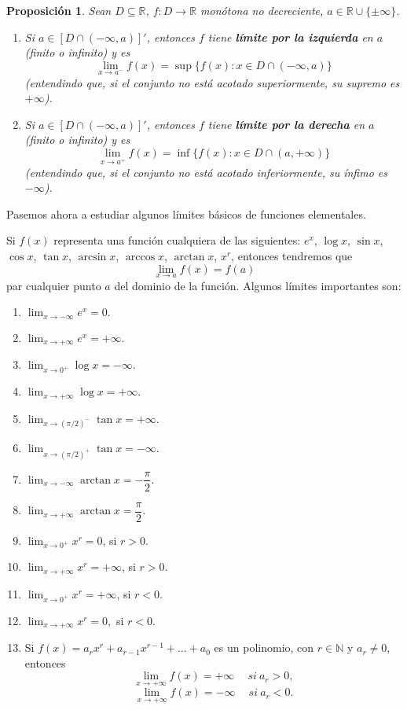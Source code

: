 \documentclass[12pt]{article}
\newtheorem{proposition}[theorem]{Proposición}
\begin{document}
\begin{proposition}Sean $D \subseteq \mathbb{R}$, $f \colon D \longrightarrow \mathbb{R}$ monótona no decreciente, $a \in \mathbb{R} \cup \lbrace \pm \infty \rbrace$. 
\begin{enumerate}
\item Si $a \in [D \cap (- \infty, a)]'$, entonces $f$ tiene \textbf{límite por la izquierda} en $a$ (finito o infinito) y es $$\lim_{x \rightarrow a^-} f(x) = \sup \lbrace f(x) : x \in D \cap (-\infty,a) \rbrace$$ (entendindo que, si el conjunto no está acotado superiormente, su supremo es $+ \infty$).
\item Si $a \in [D \cap (- \infty, a)]'$, entonces $f$ tiene \textbf{límite por la derecha} en $a$ (finito o infinito) y es $$\lim_{x \rightarrow a^+} f(x) = \inf \lbrace f(x) : x \in D \cap (a,+\infty) \rbrace$$ (entendindo que, si el conjunto no está acotado inferiormente, su ínfimo es $- \infty$).
\end{enumerate}
\end{proposition}

Pasemos ahora a estudiar algunos límites básicos de funciones elementales.

Si $f(x)$ representa una función cualquiera de las siguientes: $e^x$, $\log x$, $\sin x$, $\cos x$, $\tan x$, $\arcsin x$, $\arccos x$, $\arctan x$, $x^r$, entonces tendremos que $$\lim_{x\rightarrow a} f(x) = f(a)$$ par cualquier punto $a$ del dominio de la función. Algunos límites importantes son: \begin{enumerate}
\item $\lim_{x \rightarrow - \infty} e^x = 0.$
\item $\lim_{x \rightarrow +\infty} e^x = + \infty.$
\item $\lim_{x \rightarrow 0^+} \log x = - \infty.$
\item $\lim_{x \rightarrow +\infty} \log x = +\infty.$
\item $\lim_{x \rightarrow (\pi /2 )^-} \tan x = +\infty.$
\item $\lim_{x \rightarrow (\pi /2 )^+} \tan x = -\infty.$
\item $\lim_{x \rightarrow -\infty} \arctan x = -\dfrac{\pi}{2}.$
\item $\lim_{x \rightarrow +\infty} \arctan x = \dfrac{\pi}{2}.$
\item $\lim_{x \rightarrow 0^+} x^r = 0$, si $r>0.$
\item $\lim_{x \rightarrow +\infty} x^r = +\infty$, si $r>0$.
\item $\lim_{x \rightarrow 0^+} x^r = +\infty$, si $r<0$.
\item $\lim_{x \rightarrow +\infty} x^r = 0,$ si $r<0$.
\item Si $f(x) = a_rx^r+a_{r-1}x^{r-1} + \ldots + a_0$ es un polinomio, con $r \in \mathbb{N}$ y $a_r \neq 0$, entonces $$\lim_{x \rightarrow +\infty} f(x) = +\infty \quad~si~a_r>0 ,$$ $$\lim_{x \rightarrow +\infty} f(x) = -\infty \quad~si~a_r<0.$$
\end{enumerate}
\end{document}
